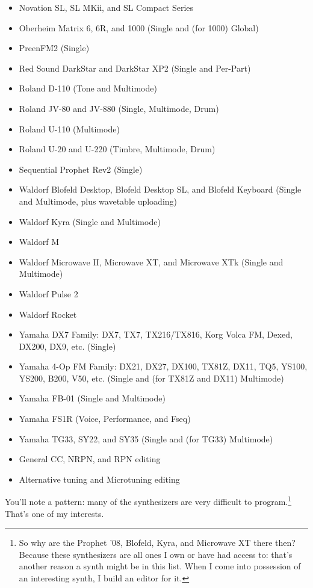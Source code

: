\documentclass{article}
\begin{document}
{\begin{multicols}{2}
\begin{flushleft}
\begin{itemize}
\item Novation SL, SL MKii, and SL Compact Series
\item Oberheim Matrix 6, 6R, and 1000 (Single and (for 1000) Global)
\item PreenFM2 (Single)
\item Red Sound DarkStar and DarkStar XP2 (Single and Per-Part)
\item Roland D-110 (Tone and Multimode)
\item Roland JV-80 and JV-880 (Single, Multimode, Drum)
\item Roland U-110 (Multimode)
\item Roland U-20 and U-220 (Timbre, Multimode, Drum)
\item Sequential Prophet Rev2 (Single)
\item Waldorf Blofeld Desktop, Blofeld Desktop SL, and Blofeld Keyboard (Single and Multimode, plus wavetable uploading)
\item Waldorf Kyra (Single and Multimode)
\item Waldorf M
\item Waldorf Microwave II, Microwave XT, and Microwave XTk (Single and Multimode)
\item Waldorf Pulse 2
\item Waldorf Rocket
\item Yamaha DX7 Family: DX7, TX7, TX216/TX816, Korg Volca FM, Dexed, DX200, DX9, etc. (Single)
\item Yamaha 4-Op FM Family: DX21, DX27, DX100, TX81Z, DX11, TQ5, YS100, YS200, B200, V50, etc. (Single and  (for TX81Z and DX11) Multimode)
\item Yamaha FB-01 (Single and Multimode)
\item Yamaha FS1R (Voice, Performance, and Fseq)
\item Yamaha TG33, SY22, and SY35 (Single and (for TG33) Multimode)
\item General CC, NRPN, and RPN editing
\item Alternative tuning and Microtuning editing
\end{itemize}
\end{flushleft}
\end{multicols}
}

You'll note a pattern: many of the synthesizers are very difficult to program.\footnote{So why are the Prophet '08, Blofeld, Kyra, and Microwave XT there then?  Because these synthesizers are all ones I own or have had access to: that's another reason a synth might be in this list.  When I come into possession of an interesting synth, I build an editor for it.}  That's one of my interests.  
\end{document}
